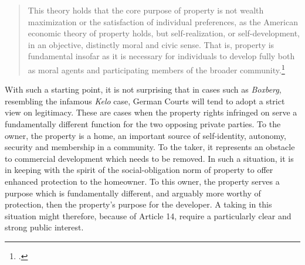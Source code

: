 \begin{quote}
This theory holds that the core purpose of property is not
wealth maximization or the satisfaction of individual preferences, as the American
economic theory of property holds, but self-realization, or self-development,
in an objective, distinctly moral and civic sense. That is, property is fundamental insofar as it is necessary for individuals to develop fully both
as moral agents and participating members of the broader community.\footcite[745]{alexander03}
\end{quote}

With such a starting point, it is not surprising that in cases such as {\it Boxberg}, resembling the infamous {\it Kelo} case, German Courts will tend to adopt a strict view on legitimacy. These are cases when the property rights infringed on serve a fundamentally different function for the two opposing private parties. To the owner, the property is a home, an important source of self-identity, autonomy, security and membership in a community. To the taker, it represents an obstacle to commercial development which needs to be removed. In such a situation, it is in keeping with the spirit of the social-obligation norm of property to offer enhanced protection to the homeowner. To this owner, the property serves a purpose which is fundamentally different, and arguably more worthy of protection, then the property's purpose for the developer. A taking in this situation might therefore, because of Article 14, require a particularly clear and strong public interest.

